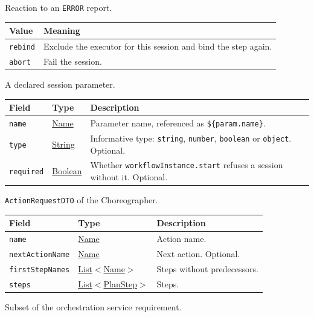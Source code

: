 \documentclass[a4paper]{arrowhead}
\newcommand{\mref}[1]{{\textcolor{ArrowheadPurple}{\hyperref[sec:model:#1]{#1}}}}
\newcommand{\pref}[1]{{\textcolor{ArrowheadGrey}{\hyperref[sec:model:primitives:#1]{#1}}}}
\begin{document}
Reaction to an \texttt{ERROR} report.

{\small
\begin{longtable}{|p{3.9cm}|p{11.9cm}|}

\hline
\rowcolor{gray!33} Value & Meaning \\ \hline
\endhead
\texttt{rebind} & Exclude the executor for this session and bind the step again. \\ \hline
\texttt{abort} & Fail the session. \\ \hline
\end{longtable}
}

A declared session parameter.

{\small
\begin{longtable}{|p{3.9cm}|p{4.4cm}|p{7.5cm}|}

\hline
\rowcolor{gray!33} Field & Type & Description \\ \hline
\endhead
\texttt{name} & \pref{Name} & Parameter name, referenced as \texttt{\$\{param.name\}}. \\ \hline
\texttt{type} & \pref{String} & Informative type: \texttt{string}, \texttt{number}, \texttt{boolean} or \texttt{object}. Optional. \\ \hline
\texttt{required} & \pref{Boolean} & Whether \texttt{workflowInstance.start} refuses a session without it. Optional. \\ \hline
\end{longtable}
}

\texttt{ActionRequestDTO} of the Choreographer.

{\small
\begin{longtable}{|p{3.9cm}|p{4.4cm}|p{7.5cm}|}

\hline
\rowcolor{gray!33} Field & Type & Description \\ \hline
\endhead
\texttt{name} & \pref{Name} & Action name. \\ \hline
\texttt{nextActionName} & \pref{Name} & Next action. Optional. \\ \hline
\texttt{firstStepNames} & \pref{List}$<$\pref{Name}$>$ & Steps without predecessors. \\ \hline
\texttt{steps} & \pref{List}$<$\mref{PlanStep}$>$ & Steps. \\ \hline
\end{longtable}
}

Subset of the orchestration service requirement.
\end{document}

